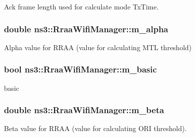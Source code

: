 Ack frame length used for calculate mode Tx\+Time. 

\subsubsection[{\texorpdfstring{m\+\_\+alpha}{m_alpha}}]{\setlength{\rightskip}{0pt plus 5cm}double ns3\+::\+Rraa\+Wifi\+Manager\+::m\+\_\+alpha\hspace{0.3cm}{\ttfamily [private]}}\hypertarget{classns3_1_1RraaWifiManager_ae374e30da98153008fe7ab5e5c4fc841}{}\label{classns3_1_1RraaWifiManager_ae374e30da98153008fe7ab5e5c4fc841}


Alpha value for R\+R\+AA (value for calculating M\+TL threshold) 

\subsubsection[{\texorpdfstring{m\+\_\+basic}{m_basic}}]{\setlength{\rightskip}{0pt plus 5cm}bool ns3\+::\+Rraa\+Wifi\+Manager\+::m\+\_\+basic\hspace{0.3cm}{\ttfamily [private]}}\hypertarget{classns3_1_1RraaWifiManager_a6855666708a35311f3bd02d614fffc8f}{}\label{classns3_1_1RraaWifiManager_a6855666708a35311f3bd02d614fffc8f}


basic 

\subsubsection[{\texorpdfstring{m\+\_\+beta}{m_beta}}]{\setlength{\rightskip}{0pt plus 5cm}double ns3\+::\+Rraa\+Wifi\+Manager\+::m\+\_\+beta\hspace{0.3cm}{\ttfamily [private]}}\hypertarget{classns3_1_1RraaWifiManager_aa17d371f547614b74583c5a841506b20}{}\label{classns3_1_1RraaWifiManager_aa17d371f547614b74583c5a841506b20}


Beta value for R\+R\+AA (value for calculating O\+RI threshold). 

